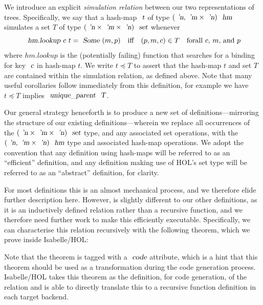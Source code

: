 \documentclass[sigconf]{acmart}
\begin{document}
We introduce an explicit \emph{simulation relation} between our two representations of trees.
Specifically, we say that a hash-map $\isa{t}$ of type $(\isa{'n}, \isa{'m} \times \isa{'n})\ \isa{hm}$ simulates a set $T$ of type $(\isa{'n} \times \isa{'m} \times \isa{'n})\ \isa{set}$ whenever
\begin{displaymath}
\isa{hm.lookup}\ c\ t = \isa{Some}\ (m, p) \quad\text{iff}\quad (p, m, c) \in T \quad\text{forall $c$, $m$, and $p$}
\end{displaymath}
where $hm.lookup$ is the (potentially failing) function that searches for a binding for key $\isa{c}$ in hash-map $t$.
We write $t \preceq T$ to assert that the hash-map $t$ and set $T$ are contained within the simulation relation, as defined above.
Note that many useful corollaries follow immediately from this definition, for example we have $t \preceq T$ implies $\isa{unique\_parent}\ \isa{T}$.

Our general strategy henceforth is to produce a new set of definitions---mirroring the structure of our existing definitions---wherein we replace all occurrences of the $(\isa{'n} \times \isa{'m} \times \isa{'n})\ \isa{set}$ type, and any associated set operations, with the $(\isa{'n}, \isa{'m} \times \isa{'n})\ \isa{hm}$ type and associated hash-map operations.
We adopt the convention that any definition using hash-maps will be referred to as an ``efficient'' definition, and any definition making use of HOL's set type will be referred to as an ``abstract'' definition, for clarity.

For most definitions this is an almost mechanical process, and we therefore elide further description here.
However,  is slightly different to our other definitions, as it is an inductively defined relation rather than a recursive function, and we therefore need further work to make this efficiently executable.
Specifically, we can characterise this relation recursively with the following theorem, which we prove inside Isabelle/HOL:


Note that the theorem  is tagged with a $\isa{code}$ attribute, which is a hint that this theorem should be used as a transformation during the code generation process.
Isabelle/HOL takes this theorem as the definition, for code generation, of the  relation and is able to directly translate this to a recursive function definition in each target backend.
\end{document}
